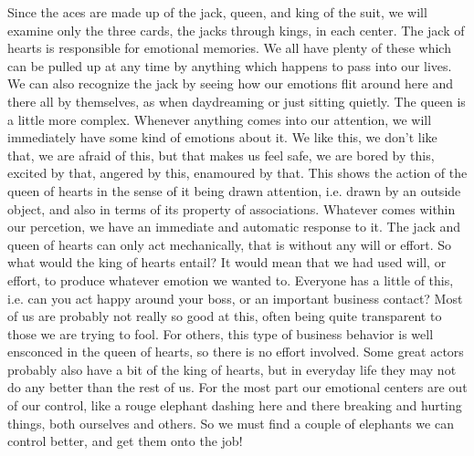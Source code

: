 \documentclass[12pt,letterpaper]{book}
\begin{document}
Since the aces are made up of the jack, queen, and king of the suit, we will examine only the three cards, the jacks through kings, in each center. The jack of hearts is responsible for emotional memories. We all have plenty of these which can be pulled up at any time by anything which happens to pass into our lives. We can also recognize the jack by seeing how our emotions flit around here and there all by themselves, as when daydreaming or just sitting quietly. The queen is a little more complex. Whenever anything comes into our attention, we will immediately have some kind of emotions about it. We like this, we don't like that, we are afraid of this, but that makes us feel safe, we are bored by this, excited by that, angered by this, enamoured by that. This shows the action of the queen of hearts in the sense of it being drawn attention, i.e. drawn by an outside object, and also in terms of its property of associations. Whatever comes within our percetion, we have an immediate and automatic response to it. The jack and queen of hearts can only act mechanically, that is without any will or effort. So what would the king of hearts entail? It would mean that we had used will, or effort, to produce whatever emotion we wanted to. Everyone has a little of this, i.e. can you act happy around your boss, or an important business contact? Most of us are probably not really so good at this, often being quite transparent to those we are trying to fool. For others, this type of business behavior is well ensconced in the queen of hearts, so there is no effort involved. Some great actors probably also have a bit of the king of hearts, but in everyday life they may not do any better than the rest of us. For the most part our emotional centers are out of our control, like a rouge elephant dashing here and there breaking and hurting things, both ourselves and others. So we must find a couple of elephants we can control better, and get them onto the job!
\end{document}
